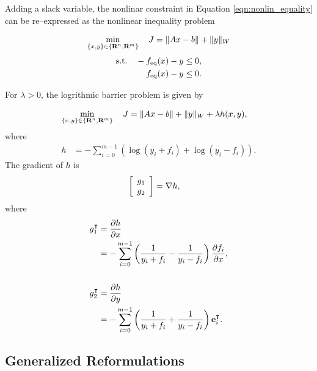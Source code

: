 \documentclass{article}
\begin{document}
    Adding a slack variable, the nonlinar constraint in Equation \ref{eqn:nonlin_equality} can be re--expressed as the nonlinear inequality problem

    \begin{align*}
        \min_{\{x,y\}\in\{\textbf{R}^n,\textbf{R}^m\}}\quad J = \|Ax-b\|+\|y\|_W
    \end{align*}
    \begin{align*}
        \text{s.t.} \quad -f_{\text{eq}}(x)-y&\leq 0,\\
        f_{\text{eq}}(x)-y&\leq 0.
    \end{align*}

    For $\lambda>0$, the logrithmic barrier problem is given by \cite[p.~562]{bv_cvxbook}

    \begin{align*}
        \min_{\{x,y\}\in\{\textbf{R}^n,\textbf{R}^m\}}\quad J &= \|Ax-b\|+\|y\|_W+\lambda h(x,y),
    \end{align*}
    where 
    \begin{align*}
        h&=-\sum_{i=0}^{m-1}\left(\log(y_i+f_i)+\log(y_i-f_i)\right).
    \end{align*}
    The gradient of $h$ is
    \begin{align*}
        \left[\begin{array}{lllllllllllllllllll}g_1\\g_2\end{array}\right]&=\nabla h, 
    \end{align*}
    where
    \begin{align*}
        g_1^\intercal&=\frac{\partial h}{\partial x}\\
            &=-\sum_{i=0}^{m-1} \left(\frac{1}{y_i+f_i}-\frac{1}{y_i-f_i}\right)\frac{\partial f_i}{\partial x}, \\\\
        g_2^\intercal&=\frac{\partial h}{\partial y}\\
            &=-\sum_{i=0}^{m-1} \left(\frac{1}{y_i+f_i}+\frac{1}{y_i-f_i}\right)\textbf{e}_i^\intercal.
    \end{align*}


\clearpage

\subsection{Generalized Reformulations}
\end{document}
